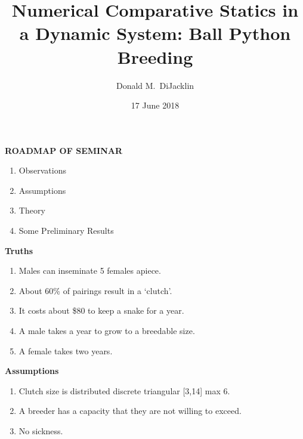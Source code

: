 \documentclass[grey,handout]{beamer}
\renewcommand{\frametitle}[1]{\begin{center}\textbf{#1}\end{center}}
\begin{document}
\title{Numerical Comparative Statics in a Dynamic System: Ball Python Breeding}

\author{Donald M.~DiJacklin}
\date{17 June 2018}

\begin{frame}
  \titlepage
\end{frame}

\begin{frame}
\frametitle{ROADMAP OF SEMINAR}
  \begin{enumerate}[<+->]
    \item Observations
    \item Assumptions
    \item Theory
    \item Some Preliminary Results
  \end{enumerate}
\end{frame}


\begin{frame}
\frametitle{Truths}
  \begin{enumerate}[<+->]
    \item Males can inseminate 5 females apiece.
    \item About 60\% of pairings result in a `clutch'.
    \item It costs about \$80 to keep a snake for a year.
    \item A male takes a year to grow to a breedable size.
    \item A female takes two years.
  \end{enumerate}
  

\end{frame}
\begin{frame}
  \frametitle{Assumptions}
  \begin{enumerate}
    \item Clutch size is distributed discrete triangular [3,14] max 6.
    \item A breeder has a capacity that they are not willing to exceed.
    \item No sickness.
  \end{enumerate}
\end{frame}
\end{document}
